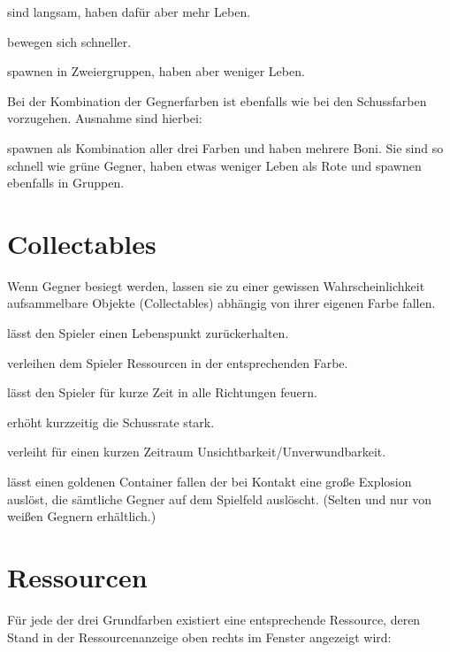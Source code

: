 \renewcommand{\itmspace}{7.5em}
{sind langsam, haben dafür aber mehr Leben.}

{bewegen sich schneller.}

{spawnen in Zweiergruppen, haben aber weniger Leben.}

Bei der Kombination der Gegnerfarben ist ebenfalls wie bei den Schussfarben vorzugehen. Ausnahme sind hierbei:

{spawnen als Kombination aller drei Farben und haben mehrere Boni. Sie sind so schnell wie grüne Gegner, haben etwas weniger Leben als Rote und spawnen ebenfalls in Gruppen.}






\section{Collectables}
\label{sect:Collectables}

Wenn Gegner besiegt werden, lassen sie zu einer gewissen Wahrscheinlichkeit aufsammelbare Objekte (Collectables) abhängig von ihrer eigenen Farbe fallen.

\renewcommand{\itmspace}{5.5em}
{lässt den Spieler einen Lebenspunkt zurückerhalten.}

{verleihen dem Spieler Ressourcen in der entsprechenden Farbe.}

{lässt den Spieler für kurze Zeit in alle Richtungen feuern.}

{erhöht kurzzeitig die Schussrate stark.}

{verleiht für einen kurzen Zeitraum Unsichtbarkeit/Unverwundbarkeit.}

{lässt einen goldenen Container fallen der bei Kontakt eine gro{\ss}e Explosion auslöst, die sämtliche Gegner auf dem Spielfeld auslöscht. (Selten und nur von wei{\ss}en Gegnern erhältlich.)}




\section{Ressourcen}
\label{sect:ressourcen}

Für jede der drei Grundfarben existiert eine entsprechende Ressource, deren Stand in der Ressourcenanzeige oben rechts im Fenster angezeigt wird:

